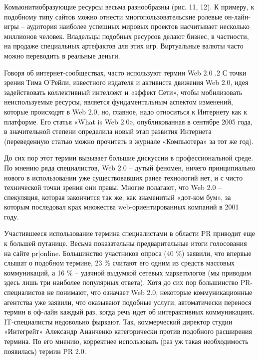 \documentclass[a4paper,english,russian]{G2-105}
\begin{document}
\par Комьюнитиобразующие ресурсы весьма разнообразны (рис. 11, 12). К примеру, к подобному типу сайтов можно отнести многопользовательские ролевые он-лайн-игры – аудитория наиболее успешных мировых проектов насчитывает несколько миллионов человек. Владельцы подобных ресурсов делают бизнес, в частности, на продаже специальных артефактов для этих игр. Виртуальные валюты часто можно переводить в реальные деньги.
\par Говоря об интернет-сообществах, часто используют термин Web 2.0 .2 С точки зрения Тима О'Рейли, известного издателя и активиста движения Web 2.0,  идея задействовать коллективный интеллект и «эффект Сети», чтобы мобилизовать неиспользуемые ресурсы, является фундаментальным аспектом изменений, которые происходят в Web 2.0,  но, главное, надо относиться к Интернету как к платформе. Его статья «What is Web 2.0», опубликованная в сентябре 2005 года, в значительной степени определила новый этап развития Интернета (переведенную статью можно прочитать в журнале «Компьютера» за тот же год).
\par До сих пор этот термин вызывает большие дискуссии в профессиональной среде. По мнению ряда специалистов, Web 2.0  – дутый феномен, ничего принципиально нового в использовании уже существовавших ранее технологий нет, и с чисто технической точки зрения они правы. Многие полагают, что Web 2.0  – спекуляция, которая закончится так же, как знаменитый «дот-ком бум», за которым последовал крах множества web-ориентированных компаний в 2001 году.
\par Участившееся использование термина специалистами в области PR приводит еще к большей путанице. Весьма показательны предварительные итоги голосования на сайте pr|online.  Большинство участников опроса (40 \%) заявили, что впервые слышат о подобном термине, 23 \%  считают его одним из средств массовых коммуникаций, а 16 \% – удачной выдумкой сетевых маркетологов (мы приводим здесь лишь три наиболее популярных ответа).
Хотя до сих пор большинство PR-специалистов не понимают, что означает Web 2.0,  некоторые коммуникационные агентства уже заявили, что оказывают подобные услуги, автоматически перенося термин в оф-лайн каждый раз, когда речь идет об интерактивных коммуникациях. IT-специалисты недовольно фыркают. Так, коммерческий директор студии «Интегрейт» Александр Ананченко категорически против подобного расширения термина. По его мнению, корректнее использовать (раз уж такая необходимость появилась) термин PR 2.0. 
\end{document}
